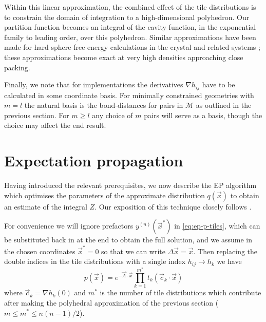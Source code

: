 \documentclass[11pt,twoside]{report}
\begin{document}
Within this linear approximation, the combined effect of the tile distributions is to constrain the domain of integration to a high-dimensional polyhedron.
Our partition function becomes an integral of the cavity function, in the exponential family to leading order, over this polyhedron.
Similar approximations have been made for hard sphere free energy calculations in the crystal \cite{RadinPRL2005,KochPRE2005} and related systems \cite{LeoniPRL2017}; these approximations become exact at very high densities approaching close packing.

Finally, we note that for implementations the derivatives $\nabla h_{ij}$ have to be calculated in some coordinate basis.
For minimally constrained geometries with $m=l$ the natural basis is the bond-distances for pairs in $\mathcal{M}$ as outlined in the previous section.
For $m \ge l$ any choice of $m$ pairs will serve as a basis, though the choice may affect the end result.

\newpage
\section{Expectation propagation}
\label{sec:ep-integration}

Having introduced the relevant prerequisites, we now describe the EP algorithm which optimises the parameters of the approximate distribution $q(\vec{x})$ to obtain an estimate of the integral $Z$.
Our exposition of this technique closely follows \cite{Cunningham2011}.

For convenience we will ignore prefactors $y^{(n)}(\vec{x}^*)$ in \eqref{eq:ep-p-tiles}, which can be substituted back in at the end to obtain the full solution, and we assume in the chosen coordinates $\vec{x}^* = 0$ so that we can write $\Delta\vec{x} = \vec{x}$.
Then replacing the double indices in the tile distributions with a single index $h_{ij} \to h_k$ we have
\begin{equation*}
  p(\vec{x})
  =
  e^{-\vec{A} \cdot \vec{x}}
  \prod_{k=1}^{m^*} t_k (\vec{c}_k \cdot \vec{x})
\end{equation*}
where $\vec{c}_k = \nabla h_k(0)$ and $m^*$ is the number of tile distributions which contribute after making the polyhedral approximation of the previous section ($m \le m^* \le n(n-1)/2$).
\end{document}
